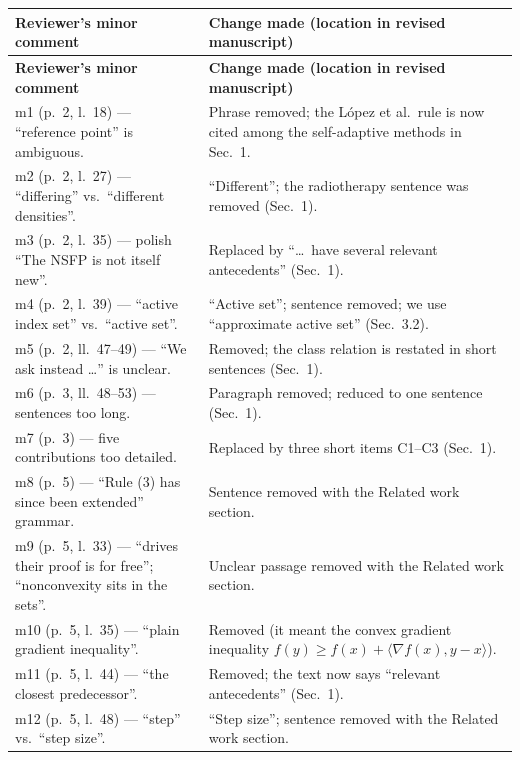\documentclass[11pt]{article}
\begin{document}
\medskip
{\footnotesize
\setlength{\tabcolsep}{5pt}
\renewcommand{\arraystretch}{1.25}
\begin{longtable}{@{}>{\raggedright\arraybackslash}p{}
                    >{\raggedright\arraybackslash}p{}@{}}
\toprule
\textbf{Reviewer's minor comment} & \textbf{Change made (location in revised manuscript)}\\
\midrule
\endfirsthead
\toprule
\textbf{Reviewer's minor comment} & \textbf{Change made (location in revised manuscript)}\\
\midrule
\endhead
\bottomrule
\endfoot
m1 (p.~2, l.~18) --- ``reference point'' is ambiguous.
  & Phrase removed; the L\'opez et al.\ rule is now cited among the self-adaptive methods in Sec.~1.\\
m2 (p.~2, l.~27) --- ``differing'' vs.\ ``different densities''.
  & ``Different''; the radiotherapy sentence was removed (Sec.~1).\\
m3 (p.~2, l.~35) --- polish ``The NSFP is not itself new''.
  & Replaced by ``\dots\ have several relevant antecedents'' (Sec.~1).\\
m4 (p.~2, l.~39) --- ``active index set'' vs.\ ``active set''.
  & ``Active set''; sentence removed; we use ``approximate active set'' (Sec.~3.2).\\
m5 (p.~2, ll.~47--49) --- ``We ask instead \dots'' is unclear.
  & Removed; the class relation is restated in short sentences (Sec.~1).\\
m6 (p.~3, ll.~48--53) --- sentences too long.
  & Paragraph removed; reduced to one sentence (Sec.~1).\\
m7 (p.~3) --- five contributions too detailed.
  & Replaced by three short items C1--C3 (Sec.~1).\\
m8 (p.~5) --- ``Rule (3) has since been extended'' grammar.
  & Sentence removed with the Related work section.\\
m9 (p.~5, l.~33) --- ``drives their proof is for free''; ``nonconvexity sits in the sets''.
  & Unclear passage removed with the Related work section.\\
m10 (p.~5, l.~35) --- ``plain gradient inequality''.
  & Removed (it meant the convex gradient inequality $f(y)\ge f(x)+\langle\nabla f(x),y-x\rangle$).\\
m11 (p.~5, l.~44) --- ``the closest predecessor''.
  & Removed; the text now says ``relevant antecedents'' (Sec.~1).\\
m12 (p.~5, l.~48) --- ``step'' vs.\ ``step size''.
  & ``Step size''; sentence removed with the Related work section.\\

\end{longtable}}
\end{document}
